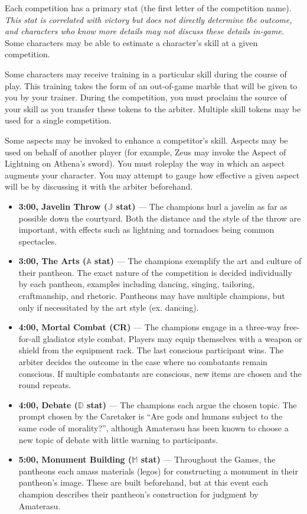 \documentclass[green]{guardians}
\begin{document}
Each competition has a primary stat (the first letter of the competition name). \emph{This stat is correlated with victory but does not directly determine the outcome, and characters who know more details may not discuss these details in-game}. Some characters may be able to estimate a character's skill at a given competition.

Some characters may receive training in a particular skill during the course of play. This training takes the form of an out-of-game marble that will be given to you by your trainer. During the competition, you must proclaim the source of your skill as you transfer these tokens to the arbiter. Multiple skill tokens may be used for a single competition.

Some aspects may be invoked to enhance a competitor's skill. Aspects may be used on behalf of another player (for example, Zeus may invoke the Aspect of Lightning on Athena's sword). You must roleplay the way in which an aspect augments your character. You may attempt to gauge how effective a given aspect will be by discussing it with the arbiter beforehand.

\begin{itemize}
  \item \textbf{3:00, Javelin Throw ($\mathbb{J}$ stat)} --- The champions hurl a javelin as far as possible down the courtyard. Both the distance and the style of the throw are important, with effects such as lightning and tornadoes being common spectacles.
	\item \textbf{3:00, The Arts ($\mathbb{A}$ stat)} --- The champions exemplify the art and culture of their pantheon. The exact nature of the competition is decided individually by each pantheon, examples including dancing, singing, tailoring, craftmanship, and rhetoric. Pantheons may have multiple champions, but only if necessitated by the art style (ex. dancing).
	\item \textbf{4:00, Mortal Combat (CR)} --- The champions engage in a three-way free-for-all gladiator style combat. Players may equip themselves with a weapon or shield from the equipment rack. The last conscious participant wins. The arbiter decides the outcome in the case where no combatants remain conscious. If multiple combatants are conscious, new items are chosen and the round repeats.
	\item \textbf{4:00, Debate ($\mathbb{D}$ stat)} --- The champions each argue the chosen topic. The prompt chosen by the Caretaker is ``Are gods and humans subject to the same code of morality?'', although Amaterasu has been known to choose a new topic of debate with little warning to participants.
	\item \textbf{5:00, Monument Building ($\mathbb{M}$ stat)} --- Throughout the Games, the pantheons each amass materials (legos) for constructing a monument in their pantheon's image. These are built beforehand, but at this event each champion describes their pantheon's construction for judgment by Amaterasu.
\end{itemize}
\end{document}
